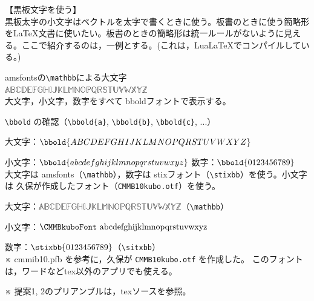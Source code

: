 \documentclass{ltjsarticle}
\DeclareRobustCommand{\kubold}[1]{\text{\CMMBkuboFont #1}}
\begin{document}
\Large\noindent
{\huge 【黒板文字を使う】}\\
黒板太字の小文字はベクトルを太字で書くときに使う。板書のときに使う簡略形を{\LaTeX}文書に使いたい。板書のときの簡略形は統一ルールがないように見える。ここで紹介するのは，一例とする。(これは，Lua\LaTeX でコンパイルしている。)

amsfontsの\verb|\mathbb|による大文字\\
$\mathbb{ABCDEFGHIJKLMNOPQRSTUVWXYZ}$\\

大文字，小文字，数字をすべて bboldフォントで表示する。\par

\verb|\bbold| の確認（\verb|\bbold{a}|, \verb|\bbold{b}|, \verb|\bbold{c}|, ...）\par
大文字：$\bbold{ABCDEFGHIJKLMNOPQRSTUVWXYZ}$\par
小文字：$\bbold{abcdefghijklmnopqrstuvwxyz}$\qquad
数字：$\bbold{0123456789}$\\


大文字は amsfonts（\verb|\mathbb|），数字は stixフォント（\verb|\stixbb|）を使う。小文字は 久保が作成したフォント（\verb|CMMB10kubo.otf|）を使う。\par
大文字：$\mathbb{ABCDEFGHIJKLMNOPQRSTUVWXYZ}$（\verb|\mathbb|）\par
小文字：$\kubold{abcdefghijklmnopqrstuvwxyz}$\par
数字：$\stixbb{0123456789}$（\verb|\sitxbb|）\\
※ cmmib10.pfb を参考に，久保が \verb|CMMB10kubo.otf| を作成した。
このフォントは，ワードなどtex以外のアプリでも使える。



\vspace{\baselineskip}

※ 提案1, 2のプリアンブルは，texソースを参照。\par
\end{document}
